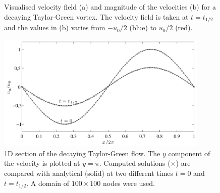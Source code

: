 \begin{figure}
  \centering
  \hspace{5pt} 
  \caption{Visualised velocity field (a) and magnitude of the
    velocities (b) for a decaying Taylor-Green vortex. The velocity
    field is taken at $t=t_{1/2}$ and the values in (b) varies from
    $-u_0/2$ (blue) to $u_0/2$ (red).}
  \label{fig:mb:taylor_vis}
\end{figure}

\begin{figure}
\begin{center}
\includegraphics[width=0.9\textwidth]{fig/taylor_uy.pdf}
\end{center}
\caption{1D section of the decaying Taylor-Green flow. The $y$
  component of the velocity is plotted at $y = \pi$. Computed solutions
  ($\times$) are compared with analytical (solid) at two different
  times $t = 0$ and $t = t_{1/2}$. A domain of $100\times100$ nodes
  were used.}
\label{fig:mb:tg_uy}
\end{figure}

